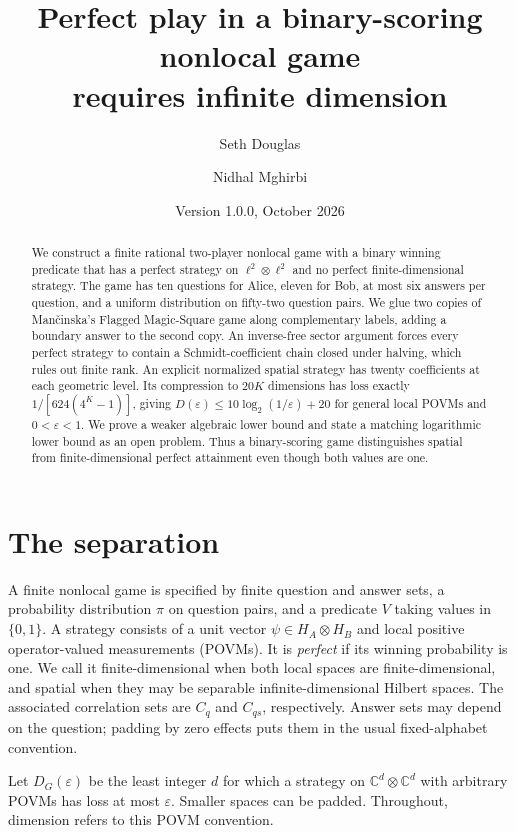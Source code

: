 \documentclass[11pt]{article}
\title{Perfect play in a binary-scoring nonlocal game\\requires infinite dimension}
\author{Seth Douglas \and Nidhal Mghirbi}
\date{Version 1.0.0, October 2026}
\theoremstyle{definition}
\newcommand{\eps}{\varepsilon}
\begin{document}
\maketitle
\begingroup\renewcommand{\thefootnote}{}\endgroup
\begin{abstract}
We construct a finite rational two-player nonlocal game with a binary winning predicate that has a perfect strategy on $\ell^2\otimes\ell^2$ and no perfect finite-dimensional strategy. The game has ten questions for Alice, eleven for Bob, at most six answers per question, and a uniform distribution on fifty-two question pairs. We glue two copies of Man\v{c}inska's Flagged Magic-Square game along complementary labels, adding a boundary answer to the second copy. An inverse-free sector argument forces every perfect strategy to contain a Schmidt-coefficient chain closed under halving, which rules out finite rank. An explicit normalized spatial strategy has twenty coefficients at each geometric level. Its compression to $20K$ dimensions has loss exactly $1/[624(4^K-1)]$, giving $D(\eps)\leq10\log_2(1/\eps)+20$ for general local POVMs and $0<\eps<1$. We prove a weaker algebraic lower bound and state a matching logarithmic lower bound as an open problem. Thus a binary-scoring game distinguishes spatial from finite-dimensional perfect attainment even though both values are one.
\end{abstract}

\section{The separation}
A finite nonlocal game is specified by finite question and answer sets, a probability distribution $\pi$ on question pairs, and a predicate $V$ taking values in $\{0,1\}$. A strategy consists of a unit vector $\psi\in H_A\otimes H_B$ and local positive operator-valued measurements (POVMs). It is \emph{perfect} if its winning probability is one. We call it finite-dimensional when both local spaces are finite-dimensional, and spatial when they may be separable infinite-dimensional Hilbert spaces. The associated correlation sets are $C_q$ and $C_{qs}$, respectively. Answer sets may depend on the question; padding by zero effects puts them in the usual fixed-alphabet convention.

Let $D_G(\eps)$ be the least integer $d$ for which a strategy on $\mathbb C^d\otimes\mathbb C^d$ with arbitrary POVMs has loss at most $\eps$. Smaller spaces can be padded. Throughout, dimension refers to this POVM convention.
\end{document}
